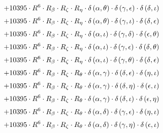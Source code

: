 \begin{subequations}
\begin{gather}
 \\[0.2em] \notag 		 + 10395 \cdot R^{6} \cdot R_{\beta{}} \cdot R_{\zeta{}} \cdot R_{\eta{}} \cdot \delta{}\left(\alpha{}, \theta{}\right) \cdot \delta{}\left(\gamma{}, \epsilon{}\right) \cdot \delta{}\left(\delta{}, \iota{}\right) 
 \\[0.2em] \notag 		 + 10395 \cdot R^{6} \cdot R_{\beta{}} \cdot R_{\zeta{}} \cdot R_{\eta{}} \cdot \delta{}\left(\alpha{}, \theta{}\right) \cdot \delta{}\left(\gamma{}, \iota{}\right) \cdot \delta{}\left(\delta{}, \epsilon{}\right) 
 \\[0.2em] \notag 		 + 10395 \cdot R^{6} \cdot R_{\beta{}} \cdot R_{\zeta{}} \cdot R_{\eta{}} \cdot \delta{}\left(\alpha{}, \iota{}\right) \cdot \delta{}\left(\gamma{}, \delta{}\right) \cdot \delta{}\left(\epsilon{}, \theta{}\right) 
 \\[0.2em] \notag 		 + 10395 \cdot R^{6} \cdot R_{\beta{}} \cdot R_{\zeta{}} \cdot R_{\eta{}} \cdot \delta{}\left(\alpha{}, \iota{}\right) \cdot \delta{}\left(\gamma{}, \epsilon{}\right) \cdot \delta{}\left(\delta{}, \theta{}\right) 
 \\[0.2em] \notag 		 + 10395 \cdot R^{6} \cdot R_{\beta{}} \cdot R_{\zeta{}} \cdot R_{\eta{}} \cdot \delta{}\left(\alpha{}, \iota{}\right) \cdot \delta{}\left(\gamma{}, \theta{}\right) \cdot \delta{}\left(\delta{}, \epsilon{}\right) 
 \\[0.2em] \notag 		 + 10395 \cdot R^{6} \cdot R_{\beta{}} \cdot R_{\zeta{}} \cdot R_{\theta{}} \cdot \delta{}\left(\alpha{}, \gamma{}\right) \cdot \delta{}\left(\delta{}, \epsilon{}\right) \cdot \delta{}\left(\eta{}, \iota{}\right) 
 \\[0.2em] \notag 		 + 10395 \cdot R^{6} \cdot R_{\beta{}} \cdot R_{\zeta{}} \cdot R_{\theta{}} \cdot \delta{}\left(\alpha{}, \gamma{}\right) \cdot \delta{}\left(\delta{}, \eta{}\right) \cdot \delta{}\left(\epsilon{}, \iota{}\right) 
 \\[0.2em] \notag 		 + 10395 \cdot R^{6} \cdot R_{\beta{}} \cdot R_{\zeta{}} \cdot R_{\theta{}} \cdot \delta{}\left(\alpha{}, \gamma{}\right) \cdot \delta{}\left(\delta{}, \iota{}\right) \cdot \delta{}\left(\epsilon{}, \eta{}\right) 
 \\[0.2em] \notag 		 + 10395 \cdot R^{6} \cdot R_{\beta{}} \cdot R_{\zeta{}} \cdot R_{\theta{}} \cdot \delta{}\left(\alpha{}, \delta{}\right) \cdot \delta{}\left(\gamma{}, \epsilon{}\right) \cdot \delta{}\left(\eta{}, \iota{}\right) 
 \\[0.2em] \notag 		 + 10395 \cdot R^{6} \cdot R_{\beta{}} \cdot R_{\zeta{}} \cdot R_{\theta{}} \cdot \delta{}\left(\alpha{}, \delta{}\right) \cdot \delta{}\left(\gamma{}, \eta{}\right) \cdot \delta{}\left(\epsilon{}, \iota{}\right) 

\end{gather}
\end{subequations}
